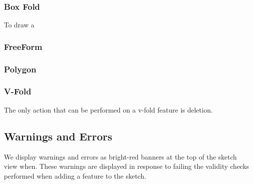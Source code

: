\subsubsection{Box Fold}\label{box-fold}

To draw a

\subsubsection{FreeForm}\label{freeform}

\subsubsection{Polygon}\label{polygon}

\subsubsection{V-Fold}\label{v-fold}

The only action that can be performed on a v-fold feature is deletion.

\subsection{Warnings and Errors}\label{warnings-and-errors}

We display warnings and errors as bright-red banners at the top of the
sketch view when. These warnings are displayed in response to failing
the validity checks performed when adding a feature to the sketch.

